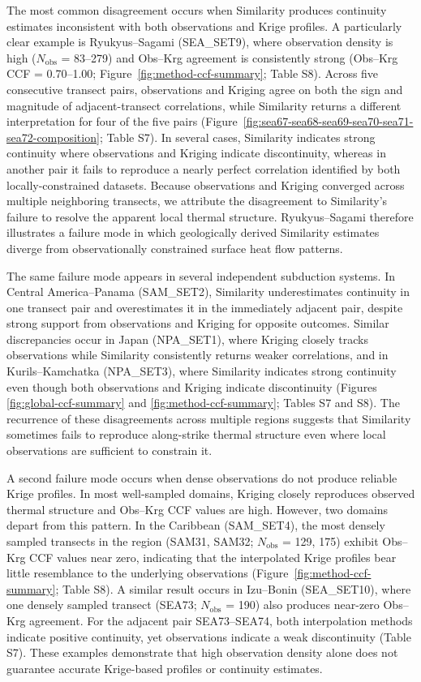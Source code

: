 \documentclass[draft,linenumbers]{agujournal2019}
\begin{document}
The most common disagreement occurs when Similarity produces continuity
estimates inconsistent with both observations and Krige profiles. A
particularly clear example is Ryukyus--Sagami (SEA\_SET9), where
observation density is high (\(N_\mathrm{obs}\) = 83--279) and Obs--Krg
agreement is consistently strong (Obs--Krg CCF = 0.70--1.00;
Figure~\ref{fig:method-ccf-summary}; Table S8). Across five consecutive
transect pairs, observations and Kriging agree on both the sign and
magnitude of adjacent-transect correlations, while Similarity returns a
different interpretation for four of the five pairs
(Figure~\ref{fig:sea67-sea68-sea69-sea70-sea71-sea72-composition}; Table
S7). In several cases, Similarity indicates strong continuity where
observations and Kriging indicate discontinuity, whereas in another pair
it fails to reproduce a nearly perfect correlation identified by both
locally-constrained datasets. Because observations and Kriging converged
across multiple neighboring transects, we attribute the disagreement to
Similarity's failure to resolve the apparent local thermal structure.
Ryukyus--Sagami therefore illustrates a failure mode in which
geologically derived Similarity estimates diverge from observationally
constrained surface heat flow patterns.

The same failure mode appears in several independent subduction systems.
In Central America--Panama (SAM\_SET2), Similarity underestimates
continuity in one transect pair and overestimates it in the immediately
adjacent pair, despite strong support from observations and Kriging for
opposite outcomes. Similar discrepancies occur in Japan (NPA\_SET1),
where Kriging closely tracks observations while Similarity consistently
returns weaker correlations, and in Kurils--Kamchatka (NPA\_SET3), where
Similarity indicates strong continuity even though both observations and
Kriging indicate discontinuity (Figures \ref{fig:global-ccf-summary} and
\ref{fig:method-ccf-summary}; Tables S7 and S8). The recurrence of these
disagreements across multiple regions suggests that Similarity sometimes
fails to reproduce along-strike thermal structure even where local
observations are sufficient to constrain it.

A second failure mode occurs when dense observations do not produce
reliable Krige profiles. In most well-sampled domains, Kriging closely
reproduces observed thermal structure and Obs--Krg CCF values are high.
However, two domains depart from this pattern. In the Caribbean
(SAM\_SET4), the most densely sampled transects in the region (SAM31,
SAM32; \(N_\mathrm{obs}\) = 129, 175) exhibit Obs--Krg CCF values near
zero, indicating that the interpolated Krige profiles bear little
resemblance to the underlying observations
(Figure~\ref{fig:method-ccf-summary}; Table S8). A similar result occurs
in Izu--Bonin (SEA\_SET10), where one densely sampled transect (SEA73;
\(N_\mathrm{obs}\) = 190) also produces near-zero Obs--Krg agreement.
For the adjacent pair SEA73--SEA74, both interpolation methods indicate
positive continuity, yet observations indicate a weak discontinuity
(Table S7). These examples demonstrate that high observation density
alone does not guarantee accurate Krige-based profiles or continuity
estimates.
\end{document}
